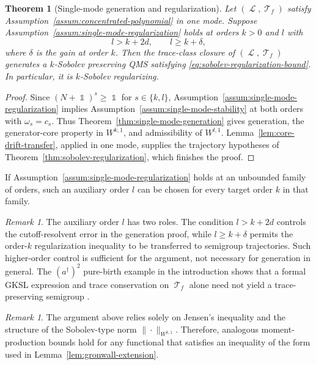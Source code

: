 \documentclass[11pt]{article}
\theoremstyle{myplain}
\newtheorem{thm}{Theorem}[section]
\theoremstyle{mydefinition}
\theoremstyle{remark}
\newtheorem{rmk}[ex]{Remark}
\DeclareMathOperator{\cL}{\mathcal{L}}
\DeclareMathOperator{\cT}{\mathcal{T}}
\DeclareMathOperator{\1}{\mathds{1}}
\begin{document}
        \begin{thm}[Single-mode generation and regularization]\label{thm:single-mode-generation-regularization}
            Let $(\cL,\cT_f)$ satisfy Assumption~\ref{assum:concentrated-polynomial} in one mode. Suppose Assumption~\ref{assum:single-mode-regularization} holds at orders $k > 0$ and $l$ with
            \begin{equation*}
                l > k + 2d,\qquad l \geq k + \delta,
            \end{equation*}
            where $\delta$ is the gain at order $k$. Then the trace-class closure of $(\cL,\cT_f)$ generates a $k$-Sobolev preserving QMS satisfying \eqref{eq:sobolev-regularization-bound}. In particular, it is $k$-Sobolev regularizing.
        \end{thm}
        \begin{proof}
            Since $(N + \1)^s \geq \1$ for $s \in \{k,l\}$, Assumption~\ref{assum:single-mode-regularization} implies Assumption~\ref{assum:single-mode-stability} at both orders with $\omega_s = c_s$. Thus Theorem~\ref{thm:single-mode-generation} gives generation, the generator-core property in $W^{k,1}$, and admissibility of $W^{l,1}$. Lemma~\ref{lem:core-drift-transfer}, applied in one mode, supplies the trajectory hypotheses of Theorem~\ref{thm:sobolev-regularization}, which finishes the proof.
        \end{proof}
        If Assumption~\ref{assum:single-mode-regularization} holds at an unbounded family of orders, such an auxiliary order $l$ can be chosen for every target order $k$ in that family.
        

        
        \begin{rmk}
            The auxiliary order $l$ has two roles. The condition $l>k+2d$ controls the cutoff-resolvent error in the generation proof, while $l\geq k+\delta$ permits the order-$k$ regularization inequality to be transferred to semigroup trajectories. Such higher-order control is sufficient for the argument, not necessary for generation in general. The $(a^\dagger)^2$ pure-birth example in the introduction shows that a formal GKSL expression and trace conservation on $\cT_f$ alone need not yield a trace-preserving semigroup \cite[Example~3.3]{Davies.1977}.
        \end{rmk}
        
        
        \begin{rmk}
            The argument above relies solely on Jensen's inequality and the structure of the Sobolev-type norm $\| \cdot \|_{W^{k,1}}$. Therefore, analogous moment-production bounds hold for any functional that satisfies an inequality of the form used in Lemma~\ref{lem:gronwall-extension}.
        \end{rmk}
\end{document}
